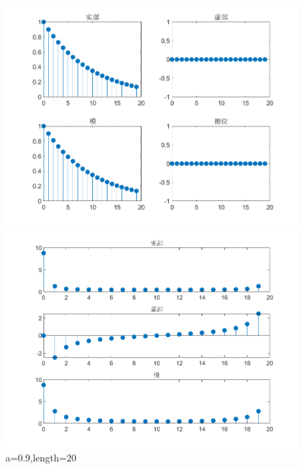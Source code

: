 \documentclass{../source/zjureport}
\begin{document}
                \newpage

                \begin{figure}[htbp]
                    \centering
                    \begin{minipage}[t]{0.48\textwidth}
                    \centering
                    \includegraphics[width=\textwidth]{figure/实指数序列_a=09,length=20.png}
                    \end{minipage}
                    \begin{minipage}[t]{0.48\textwidth}
                    \centering
                    \includegraphics[width=\textwidth]{figure/频谱_实指数序列_a=09,length=20.png}
                    \end{minipage}
                    \caption{a=0.9,length=20}
                \end{figure}
\end{document}
